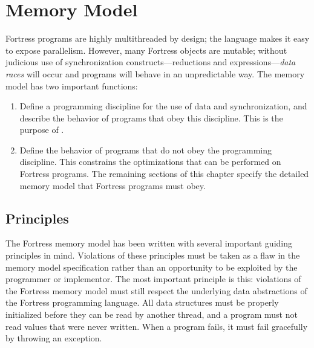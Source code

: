 %
%
%
%

\chapter{Memory Model}

Fortress programs are highly multithreaded by design; the language
makes it easy to expose parallelism.  However, many Fortress objects
are mutable; without judicious use of synchronization
constructs---reductions and  expressions---\emph{data
  races} will occur and programs will behave in an unpredictable way.
The memory model has two important functions:
\begin{enumerate}
\item Define a programming discipline for the use of data and
  synchronization, and describe the behavior of programs that obey
  this discipline.  This is the purpose of
  .
\item Define the behavior of programs that do not obey the programming
  discipline.  This constrains the optimizations that can be performed
  on Fortress programs.  The remaining sections of this chapter
  specify the detailed memory model that Fortress programs must obey.
\end{enumerate}

\section{Principles}

The Fortress memory model has been written with several important
guiding principles in mind.  Violations of these principles must be
taken as a flaw in the memory model specification rather than an
opportunity to be exploited by the programmer or implementor.  The most
important principle is this: violations of the Fortress memory model
must still respect the underlying data abstractions of the Fortress
programming language.  All data structures must be properly
initialized before they can be read by another thread, and a program
must not read values that were never written.  When a program fails,
it must fail gracefully by throwing an exception.

